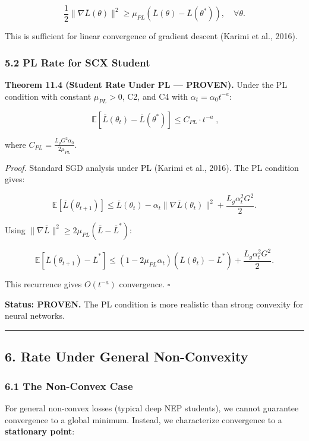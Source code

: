 \documentclass[
  12pt,
]{ctexart}
\begin{document}
\[\frac{1}{2} \|\nabla \bar{L}(\theta)\|^2 \geq \mu_{PL} (\bar{L}(\theta) - \bar{L}(\theta^*)), \quad \forall \theta.\]

This is sufficient for linear convergence of gradient descent (Karimi et
al., 2016).

\subsubsection{5.2 PL Rate for SCX
Student}\label{pl-rate-for-scx-student}

\textbf{Theorem 11.4 (Student Rate Under PL --- PROVEN).} Under the PL
condition with constant \(\mu_{PL} > 0\), C2, and C4 with
\(\alpha_t = \alpha_0 t^{-a}\):

\[\boxed{\;\mathbb{E}[\bar{L}(\theta_t) - \bar{L}(\theta^*)] \leq C_{PL} \cdot t^{-a}\;},\]

where \(C_{PL} = \frac{L_g G^2 \alpha_0}{2\mu_{PL}}\).

\emph{Proof.} Standard SGD analysis under PL (Karimi et al., 2016). The
PL condition gives:

\[\mathbb{E}[\bar{L}(\theta_{t+1})] \leq \bar{L}(\theta_t) - \alpha_t \|\nabla \bar{L}(\theta_t)\|^2 + \frac{L_g \alpha_t^2 G^2}{2}.\]

Using \(\|\nabla \bar{L}\|^2 \geq 2\mu_{PL}(\bar{L} - \bar{L}^*)\):

\[\mathbb{E}[\bar{L}(\theta_{t+1}) - \bar{L}^*] \leq (1 - 2\mu_{PL}\alpha_t)(\bar{L}(\theta_t) - \bar{L}^*) + \frac{L_g \alpha_t^2 G^2}{2}.\]

This recurrence gives \(O(t^{-a})\) convergence. \(\square\)

\textbf{Status: PROVEN.} The PL condition is more realistic than strong
convexity for neural networks.

\begin{center}\rule{0.5\linewidth}{0.5pt}\end{center}

\subsection{6. Rate Under General
Non-Convexity}\label{rate-under-general-non-convexity}

\subsubsection{6.1 The Non-Convex Case}\label{the-non-convex-case}

For general non-convex losses (typical deep NEP students), we cannot
guarantee convergence to a global minimum. Instead, we characterize
convergence to a \textbf{stationary point}:
\end{document}
